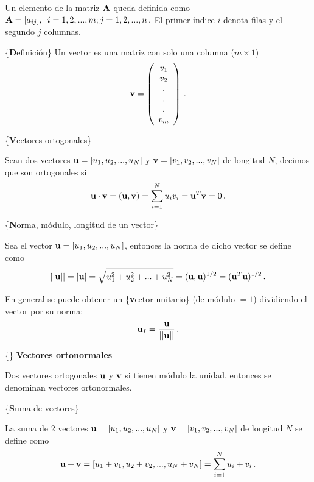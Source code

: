 \documentclass[
]{agujournal2019}
\begin{document}
Un elemento de la matriz \({\textbf A}\) queda definida como
\({\textbf A}=[a_{ij}],\,\,\,i=1,2,...,m; j=1,2,...,n\,.\) El primer
índice \(i\) denota filas y el segundo \(j\) columnas.

\vspace{0.5cm}

\{\noindent \textbf Definición\} Un vector es una matriz con solo una
columna (\(m\times1\)) \[{\textbf v}=\left( \begin{array}{c}
 v_1 \\ v_2 \\ . \\ . \\ . \\ v_m
       \end{array} \right)
       \,.\]

\vspace{0.5cm}

\{\noindent \textbf Vectores ortogonales\}

Sean dos vectores \({\textbf u}=[u_1,u_2,...,u_N]\) y
\({\textbf v}=[v_1,v_2,...,v_N]\) de longitud \(N\), decimos que son
ortogonales si
\[{\textbf u}\cdot{\textbf v}=({\textbf u},{\textbf v})=\sum\limits^N_{i=1} u_i v_i={\textbf u}^T{\textbf v}=0\,.\]

\vspace{0.5cm}

\{\noindent \textbf Norma, módulo, longitud de un vector\}

Sea el vector \({\textbf u}=[u_1,u_2,...,u_N]\), entonces la norma de
dicho vector se define como
\[||{\textbf u}||=|{\textbf u}|=\sqrt{u^2_1 + u^2_2 + ... + u^2_N}=({\textbf u},{\textbf u})^{1/2}=({\textbf u}^T{\textbf u})^{1/2}\,.\]

En general se puede obtener un \{\textbf vector unitario\} (de módulo
\(=1\)) dividiendo el vector por su norma:
\[{\textbf u}_I=\frac{{\textbf u}}{||{\textbf u}||}\,.\]

\vspace{0.5cm}

\{\noindent\} \textbf{Vectores ortonormales}

Dos vectores ortogonales \({\textbf u}\) y \({\textbf v}\) si tienen
módulo la unidad, entonces se denominan vectores ortonormales.

\vspace{0.5cm}

\{\noindent \textbf Suma de vectores\}

La suma de 2 vectores \({\textbf u}=[u_1,u_2,...,u_N]\) y
\({\textbf v}=[v_1,v_2,...,v_N]\) de longitud \(N\) se define como
\[{\textbf u} + {\textbf v}= [u_1 + v_1, u_2 + v_2,..., u_N + v_N]=\sum\limits^N_{i=1} u_i + v_i\,.\]
\end{document}
